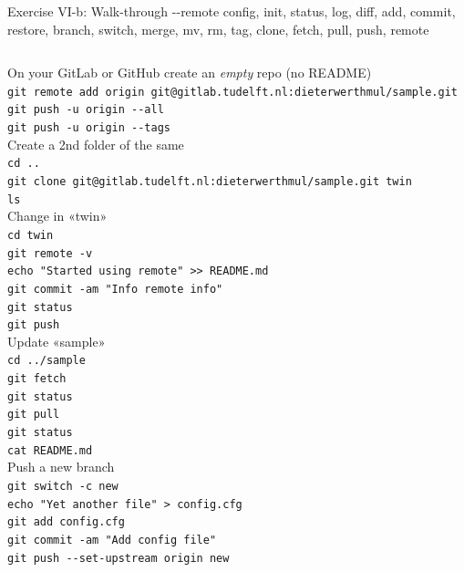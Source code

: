 \documentclass[aspectratio=169]{beamer}
\newcommand{\code}[1]{\texttt{\color{mygreen}#1}}
\begin{document}
\begin{frame}[t]
  {Exercise VI-b: Walk-through -{}-remote}
  \tiny
  \vspace{-1.5em}
  config, init, status, log, diff,
  add, commit, restore,
  branch, switch, merge,
  mv, rm,
  tag,
  clone, fetch, pull, push,
  remote\\[2em]

  \begin{columns}[t]
    On your GitLab or GitHub create an \emph{empty} repo (no README)\\
    \code{git remote add origin git@gitlab.tudelft.nl:dieterwerthmul/sample.git}\\
    \code{git push -u origin -{}-all}\\
    \code{git push -u origin -{}-tags}\\[1em]

    Create a 2nd folder of the same\\
    \code{cd ..}\\
    \code{git clone git@gitlab.tudelft.nl:dieterwerthmul/sample.git twin}\\
    \code{ls}\\[1em]

    Change in «twin»\\
    \code{cd twin}\\
    \code{git remote -v}\\
    \code{echo "Started using remote" >{}> README.md}\\
    \code{git commit -am "Info remote info"}\\
    \code{git status}\\
    \code{git push}\\[1em]

    Update «sample»\\
    \code{cd ../sample}\\
    \code{git fetch}\\
    \code{git status}\\
    \code{git pull}\\
    \code{git status}\\
    \code{cat README.md}\\[1em]

    Push a new branch\\
    \code{git switch -c new}\\
    \code{echo "Yet another file" > config.cfg}\\
    \code{git add config.cfg}\\
    \code{git commit -am "Add config file"}\\
    \code{git push -{}-set-upstream origin new}\\[1em]


\end{columns}
\end{frame}
\end{document}

